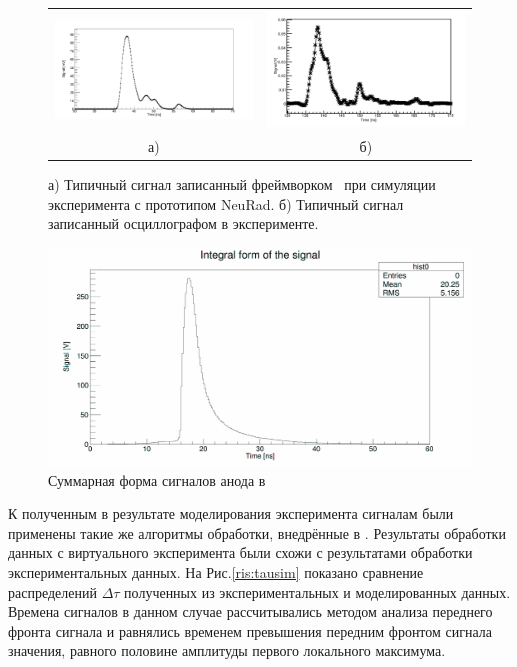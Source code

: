 \begin{figure}[!ht]
	\centering
	\begin{tabular}{cc}
		\includegraphics[width=0.52\linewidth]{simSignal1.png} 
		&
		\includegraphics[width=0.48\linewidth]{originalsignalform.png} \\
		а) & б)
	\end{tabular}
	\caption[Short caption for list of figures]{а) Типичный сигнал записанный фреймворком \er\ при симуляции эксперимента с прототипом  NeuRad. б) Типичный сигнал записанный осциллографом в эксперименте.}
	\label{ris:compare}
\end{figure}

\begin{figure}[!ht]
	\centering
	\includegraphics[width=0.8\linewidth]{integralSim.png}
	\caption{Суммарная форма сигналов анода в \er}
	\label{ris:integralSim}
\end{figure}

К полученным в результате моделирования эксперимента сигналам были применены такие же алгоритмы обработки, внедрённые в \er. 
%
Результаты обработки данных с виртуального эксперимента были схожи с результатами обработки экспериментальных данных. На Рис.\ref{ris:tausim} показано сравнение распределений $\Delta\tau$ полученных из экспериментальных и моделированных данных. Времена сигналов в данном случае рассчитывались методом анализа переднего фронта сигнала и равнялись временем превышения передним фронтом сигнала значения, равного половине амплитуды первого локального максимума.

